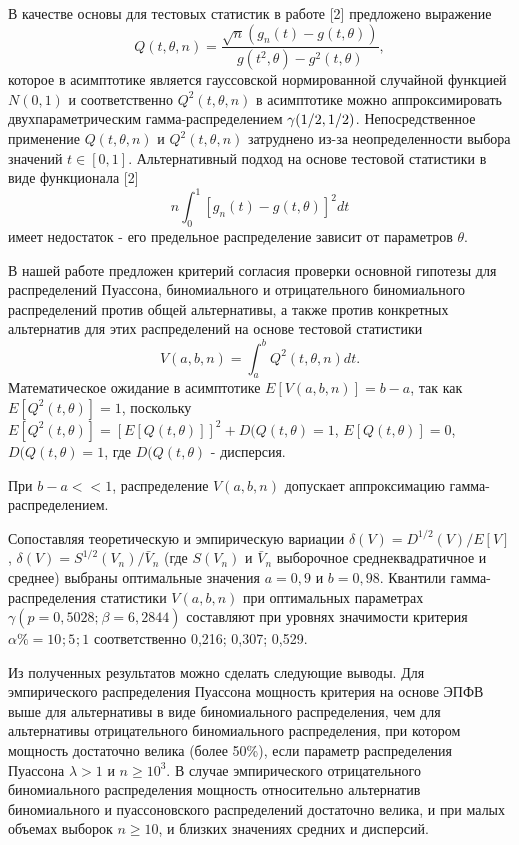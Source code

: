 В качестве основы для тестовых статистик в работе [2] предложено выражение
\[Q(t,\theta ,n)=\frac{\sqrt{n} \left(g_{n} (t)-g(t,\theta )\right)}{g(t^{2} ,\theta )-g^{2} (t,\theta )} ,\]
которое в асимптотике является гауссовской нормированной случайной функцией
 $N(0,1)$  и соответственно $Q^{2} (t,\theta ,n)$ в асимптотике можно аппроксимировать двухпараметрическим гамма-распределением $\gamma ({1 \mathord{\left/{\vphantom{1 2}}\right.\kern-\nulldelimiterspace} 2} ,{1 \mathord{\left/{\vphantom{1 2}}\right.\kern-\nulldelimiterspace} 2} )$. Непосредственное применение $Q(t,\theta ,n)$ и $Q^{2} (t,\theta ,n)$ затруднено из-за неопределенности выбора значений $t\in [0,1]$. Альтернативный подход на основе тестовой статистики в виде функционала [2]
\[n\int _{0}^{1}\left[g_{n} (t)-g(t,\theta )\right]^{2} dt \]
имеет недостаток  - его предельное распределение зависит от параметров $\theta $.

В нашей работе предложен критерий согласия проверки основной гипотезы для распределений Пуассона, биномиального и  отрицательного биномиального распределений против общей альтернативы, а также против конкретных альтернатив для этих распределений на основе тестовой статистики
\[V(a,b,n)=\int _{a}^{b}Q^{2} (t,\theta ,n)dt .\]
Математическое ожидание в асимптотике $E[V(a,b,n)]=b-a$, так как $E[Q^{2} (t,\theta )]=1$, поскольку $E[Q^{2} (t,\theta )]=[E[Q(t,\theta )]]^{2} +D(Q(t,\theta )=1$,  $E[Q(t,\theta )]=0$, $D(Q(t,\theta )=1$, где $D(Q(t,\theta )$ - дисперсия.

При $b-a<<1$, распределение $V(a,b,n)$ допускает аппроксимацию гамма-распределением.


 Сопоставляя теоретическую и эмпирическую вариации $\delta (V)=D^{1/2} (V)/E[V]$, $\delta  (V)=S^{1/2} (V_{n} )/\bar{V}_{n} $ (где $S(V_{n} )$ и $\bar{V}_{n} $ выборочное среднеквадратичное  и среднее) выбраны оптимальные значения $a=0,9$ и $b=0,98$. Квантили  гамма-распределения статистики $V(a,b,n)$ при оптимальных параметрах $\gamma (p=0,5028;_{} \beta =6,2844)$ составляют при уровнях значимости критерия $\alpha \% =10_{}  ;5_{}  ;1$  соответственно 0,216;   0,307;  0,529.


Из полученных результатов можно сделать следующие выводы.
Для эмпирического распределения Пуассона мощность критерия на основе ЭПФВ выше для альтернативы в виде биномиального распределения,
чем для альтернативы отрицательного биномиального распределения,
при котором мощность достаточно велика (более 50\%), если параметр распределения Пуассона  $\lambda >1$ и $n\geqslant 10^{3} $.
В случае эмпирического отрицательного биномиального распределения мощность относительно альтернатив
биномиального и пуассоновского распределений достаточно велика, и при малых объемах выборок $n\geqslant 10$,
и близких значениях средних и дисперсий.

